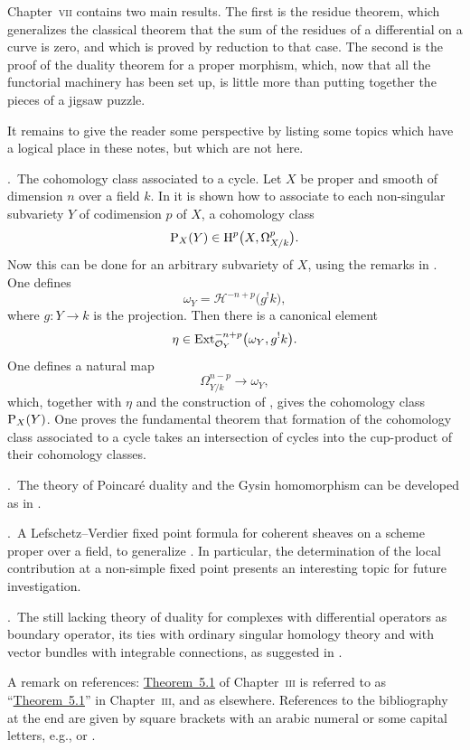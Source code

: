 Chapter~\textsc{vii} contains two main results. The first is the residue theorem, which generalizes the classical theorem that the sum of the residues of a differential on a curve is zero, and which is proved by reduction to that case. The second is the proof of the duality theorem for a proper morphism, which, now that all the functorial machinery has been set up, is little more than putting together the pieces of a jigsaw puzzle.

It remains to give the reader some perspective by listing some topics which have a logical place in these notes, but which are not here.

\medskip
{}.\ The cohomology class associated to a cycle.
Let $X$ be proper and smooth of dimension $n$ over a field $k$. In \cite[\nopp \S4]{8} it is shown how to associate to each non-singular subvariety $Y$ of codimension $p$ of $X$, a cohomology class
\[
\operatorname{P}_{X}(Y) \in \operatorname{H}^{p}\bigl(X, \Omega_{X/k}^{p}\bigr).
\]
Now this can be done for an arbitrary subvariety of $X$, using the remarks in \cite{9}. One defines
\[
\omega_{Y} = \mathcal{H}^{-n+p}\bigl(g^{!}k\bigr),
\]
where $g\colon Y\to k$ is the projection. Then there is a canonical element
\[
\eta \in \operatorname{Ext}_{\mathcal{O}_{Y}}^{-n+p}\bigl(\omega_{Y}, g^{!}k\bigr).
\]
One defines a natural map
\[
\Omega_{Y/k}^{n-p} \to \omega_{Y},
\]
which, together with $\eta$ and the construction of \cite[\nopp \S4]{8}, gives the cohomology class $\operatorname{P}_{X}(Y)$. One proves the fundamental theorem that formation of the cohomology class associated to a cycle takes an intersection of cycles into the cup-product of their cohomology classes.

\medskip
{}.\ The theory of Poincaré duality and the Gysin homomorphism can be developed as in \cite[\nopp \S7]{8}.

\medskip
{}.\ A Lefschetz--Verdier fixed point formula for coherent sheaves on a scheme proper over a field, to generalize \cite[\nopp Thm.~2]{21}. In particular, the determination of the local contribution at a non-simple fixed point presents an interesting topic for future investigation.

\medskip
{}.\ The still lacking theory of duality for complexes with differential operators as boundary operator, its ties with ordinary singular homology theory and with vector bundles with integrable connections, as suggested in \cite{22}.

\bigskip

A remark on references: \hyperref[thm:3.5.1]{Theorem~5.1} of Chapter~\textsc{iii} is referred to as ``\hyperref[thm:3.5.1]{Theorem~5.1}'' in Chapter~\textsc{iii}, and as  elsewhere. References to the bibliography at the end are given by square brackets with an arabic numeral or some capital letters, e.g., \cite[\nopp (31.1)]{14} or \cite[\nopp III,~2.1.12]{EGA}.
\par
\endgroup
